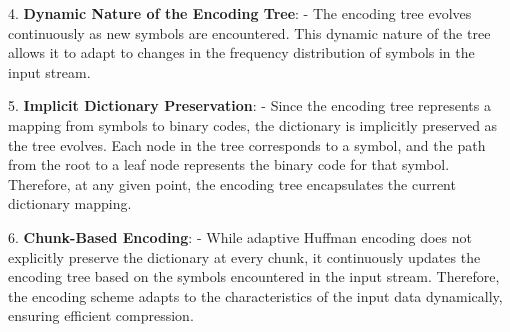 \documentclass[scrartcl]{article}
\begin{document}
   4. \textbf{Dynamic Nature of the Encoding Tree}: 
      - The encoding tree evolves continuously as new symbols are encountered. This dynamic nature of the tree allows it to adapt to changes in the frequency distribution of symbols in the input stream.
   
   5. \textbf{Implicit Dictionary Preservation}: 
      - Since the encoding tree represents a mapping from symbols to binary codes, the dictionary is implicitly preserved as the tree evolves. Each node in the tree corresponds to a symbol, and the path from the root to a leaf node represents the binary code for that symbol. Therefore, at any given point, the encoding tree encapsulates the current dictionary mapping.
   
   6. \textbf{Chunk-Based Encoding}: 
      - While adaptive Huffman encoding does not explicitly preserve the dictionary at every chunk, it continuously updates the encoding tree based on the symbols encountered in the input stream. Therefore, the encoding scheme adapts to the characteristics of the input data dynamically, ensuring efficient compression.
   
   
\end{document}
